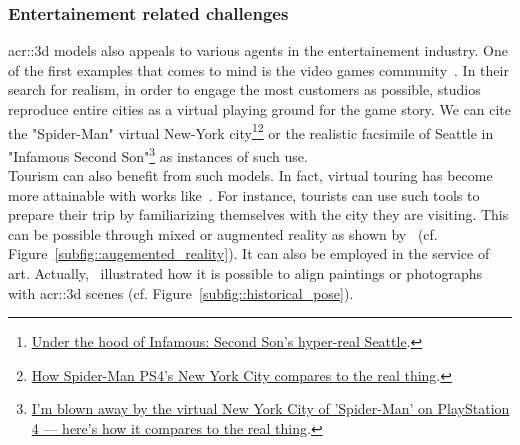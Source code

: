         \subsubsection{Entertainement related challenges}
            \gls{acr::3d} models also appeals to various agents in the entertainement industry.
            One of the first examples that comes to mind is the video games community~\parencite{watson2008procedural}.
            In their search for realism, in order to engage the most customers as possible, studios reproduce entire cities as a virtual playing ground for the game story.
            We can cite the "Spider-Man" virtual New-York city\footnote{
                \href{https://www.polygon.com/2013/9/25/4702318/under-the-hood-of-infamous-second-son-hyper-real-seattle}{Under the hood of Infamous: Second Son's hyper-real Seattle}.
            }\footnote{
                \href{https://www.polygon.com/e3/2018/6/12/17453588/spider-man-ps4-new-york-city-avengers-demo-preview}{How Spider-Man PS4’s New York City compares to the real thing}.
            } or the realistic facsimile of Seattle in "Infamous Second Son"\footnote{
                \href{http://www.businessinsider.fr/us/spider-man-ps4-new-york-city-2018-9}{I'm blown away by the virtual New York City of 'Spider-Man' on PlayStation 4 — here's how it compares to the real thing}.
            } as instances of such use.\\
            Tourism can also benefit from such models.
            In fact, virtual touring has become more attainable with works like~\textcite{koutsoudis20073d}.
            For instance, tourists can use such tools to prepare their trip by familiarizing themselves with the city they are visiting.
            This can be possible through mixed or augmented reality as shown by~\textcite{devaux20183d} (cf. Figure~\ref{subfig::augemented_reality}).
            It can also be employed in the service of art.
            Actually,~\textcite{russell2011automatic,aubry2014painting} illustrated how it is possible to align paintings or photographs with \gls{acr::3d} scenes (cf. Figure~\ref{subfig::historical_pose}).\\
